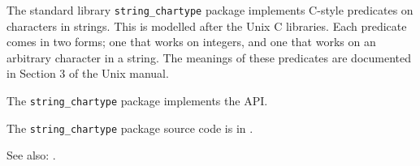 
The standard library {\tt string\_chartype} package implements 
C-style predicates on characters in strings.  This is modelled after the Unix C libraries.  
Each predicate comes in two forms; one that works on integers, and one 
that works on an arbitrary character in a string.  The meanings of these 
predicates are documented in Section 3 of the Unix manual. 

The {\tt string\_chartype} package implements the  API.

The {\tt string\_chartype} package source code is in .

See also: .
